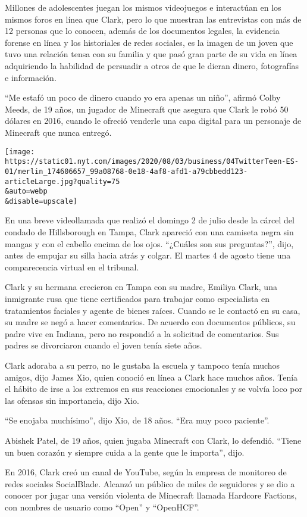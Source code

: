 Millones de adolescentes juegan los mismos videojuegos e interactúan en
los mismos foros en línea que Clark, pero lo que muestran las
entrevistas con más de 12 personas que lo conocen, además de los
documentos legales, la evidencia forense en línea y los historiales de
redes sociales, es la imagen de un joven que tuvo una relación tensa con
su familia y que pasó gran parte de su vida en línea adquiriendo la
habilidad de persuadir a otros de que le dieran dinero, fotografías e
información.

``Me estafó un poco de dinero cuando yo era apenas un niño'', afirmó
Colby Meeds, de 19 años, un jugador de Minecraft que asegura que Clark
le robó 50 dólares en 2016, cuando le ofreció venderle una capa digital
para un personaje de Minecraft que nunca entregó.

\texttt{[image: https://static01.nyt.com/images/2020/08/03/business/04TwitterTeen-ES-01/merlin\_174606657\_99a08768-0e18-4af8-afd1-a79cbbedd123-articleLarge.jpg?quality=75\\\&auto=webp\\\&disable=upscale]}

En una breve videollamada que realizó el domingo 2 de julio desde la
cárcel del condado de Hillsborough en Tampa, Clark apareció con una
camiseta negra sin mangas y con el cabello encima de los ojos. ``¿Cuáles
son sus preguntas?'', dijo, antes de empujar su silla hacia atrás y
colgar. El martes 4 de agosto tiene una comparecencia virtual en el
tribunal.

Clark y su hermana crecieron en Tampa con su madre, Emiliya Clark, una
inmigrante rusa que tiene certificados para trabajar como especialista
en tratamientos faciales y agente de bienes raíces. Cuando se le
contactó en su casa, su madre se negó a hacer comentarios. De acuerdo
con documentos públicos, su padre vive en Indiana, pero no respondió a
la solicitud de comentarios. Sus padres se divorciaron cuando el joven
tenía siete años.

Clark adoraba a su perro, no le gustaba la escuela y tampoco tenía
muchos amigos, dijo James Xio, quien conoció en línea a Clark hace
muchos años. Tenía el hábito de irse a los extremos en sus reacciones
emocionales y se volvía loco por las ofensas sin importancia, dijo Xio.

``Se enojaba muchísimo'', dijo Xio, de 18 años. ``Era muy poco
paciente''.

Abishek Patel, de 19 años, quien jugaba Minecraft con Clark, lo
defendió. ``Tiene un buen corazón y siempre cuida a la gente que le
importa'', dijo.

En 2016, Clark creó un canal de YouTube, según la empresa de monitoreo
de redes sociales SocialBlade. Alcanzó un público de miles de seguidores
y se dio a conocer por jugar una versión violenta de Minecraft llamada
Hardcore Factions, con nombres de usuario como ``Open'' y ``OpenHCF''.

